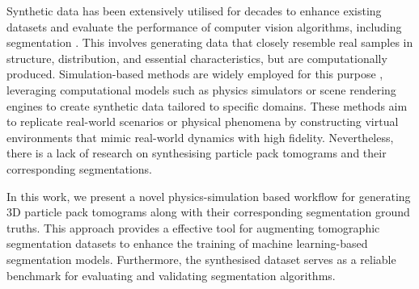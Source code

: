 \documentclass[preprint,12pt]{elsarticle}
\begin{document}
Synthetic data has been extensively utilised for decades to enhance existing datasets and evaluate the performance of computer vision algorithms, including segmentation \citep{richter2016playingdatagroundtruth}. 
This involves generating data that closely resemble real samples in structure, distribution, and essential characteristics, but are computationally produced.
Simulation-based methods are widely employed for this purpose \citep{demelo2022nextgeneration}, leveraging computational models such as physics simulators or scene rendering engines to create synthetic data tailored to specific domains. 
These methods aim to replicate real-world scenarios or physical phenomena by constructing virtual environments that mimic real-world dynamics with high fidelity.
Nevertheless, there is a lack of research on synthesising particle pack tomograms and their corresponding segmentations.


In this work, we present a novel physics-simulation based workflow for generating 3D particle pack tomograms along with their corresponding segmentation ground truths. 
This approach provides a effective tool for augmenting tomographic segmentation datasets to enhance the training of machine learning-based segmentation models.
Furthermore, the synthesised dataset serves as a reliable benchmark for evaluating and validating segmentation algorithms.
\end{document}
